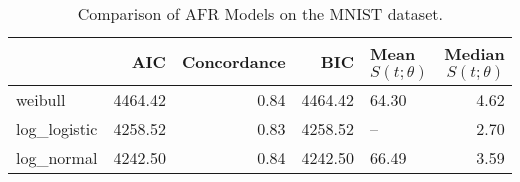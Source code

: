 \begin{table}
\caption{Comparison of AFR Models on the MNIST dataset.}
\label{tab:mnist}
\begin{tabular}{lrrrlr}
\toprule
 & AIC & Concordance & BIC & Mean $S(t;\theta)$ & Median $S(t;\theta)$ \\
\midrule
weibull & 4464.42 & 0.84 & 4464.42 & 64.30 & 4.62 \\
log_logistic & 4258.52 & 0.83 & 4258.52 & -- & 2.70 \\
log_normal & 4242.50 & 0.84 & 4242.50 & 66.49 & 3.59 \\
\bottomrule
\end{tabular}
\end{table}
